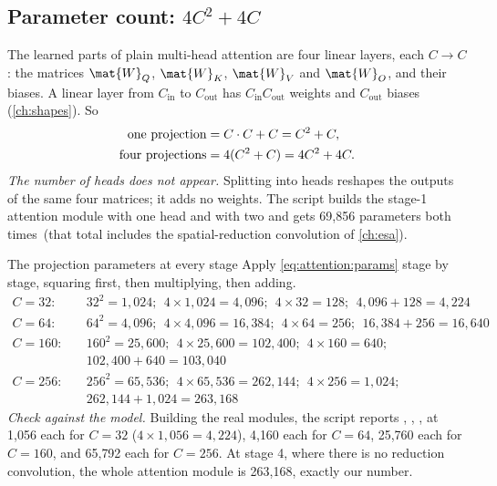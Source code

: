 \subsection{Parameter count: \texorpdfstring{$4C^2 + 4C$}{4C squared plus 4C}}

The learned parts of plain multi-head attention are four linear layers, each $C\to C$: the matrices
$\mat{W}_Q$, $\mat{W}_K$, $\mat{W}_V$ and $\mat{W}_O$, and their biases. A linear layer from
$C_\text{in}$ to $C_\text{out}$ has $C_\text{in}C_\text{out}$ weights and $C_\text{out}$ biases
(\cref{ch:shapes}). So
\begin{align}
  \text{one projection} &= C\cdot C + C = C^2 + C, \notag\\
  \text{four projections} &= 4(C^2 + C) = 4C^2 + 4C . \label{eq:attention:params}
\end{align}
\emph{The number of heads does not appear.} Splitting into heads reshapes the outputs of the same
four matrices; it adds no weights. The script builds the stage-1 attention module with one head
and with two and gets 69{,}856 parameters both times\tagC\ (that total includes the
spatial-reduction convolution of \cref{ch:esa}).

\begin{worked}[label={we:attention:params}]{The projection parameters at every stage}
Apply \cref{eq:attention:params} stage by stage, squaring first, then multiplying, then adding.
\begin{align*}
  C = 32:&\quad 32^2 = 1{,}024;\ \ 4\times1{,}024 = 4{,}096;\ \ 4\times32 = 128;\ \ 4{,}096 + 128 = 4{,}224\\
  C = 64:&\quad 64^2 = 4{,}096;\ \ 4\times4{,}096 = 16{,}384;\ \ 4\times64 = 256;\ \ 16{,}384 + 256 = 16{,}640\\
  C = 160:&\quad 160^2 = 25{,}600;\ \ 4\times25{,}600 = 102{,}400;\ \ 4\times160 = 640;\\
  &\quad 102{,}400 + 640 = 103{,}040\\
  C = 256:&\quad 256^2 = 65{,}536;\ \ 4\times65{,}536 = 262{,}144;\ \ 4\times256 = 1{,}024;\\
  &\quad 262{,}144 + 1{,}024 = 263{,}168
\end{align*}
\emph{Check against the model.} Building the real  modules, the
script reports , , ,  at 1{,}056 each for $C=32$
($4\times1{,}056 = 4{,}224$), 4{,}160 each for $C=64$, 25{,}760 each for $C=160$, and 65{,}792 each
for $C=256$\tagC. At stage 4, where there is no reduction convolution, the whole attention module
is 263{,}168, exactly our number.
\end{worked}

